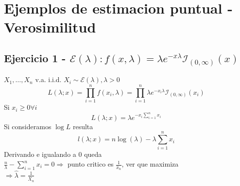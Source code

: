 \documentclass[a4paper]{article}
\begin{document}
\section{Ejemplos de estimacion puntual - Verosimilitud}
\subsection{Ejercicio 1 - $\mathcal{E}(\lambda):f(x,\lambda) = \lambda e^{-x\lambda}\mathcal{I}_{(0, \infty)}(x)$}
$X_{1},\dots,X_{n}$ v.a. i.i.d. $X_{i} \sim \mathcal{E}(\lambda), \lambda > 0$
\begin{equation*}
    L(\lambda; x) = \prod_{i=1}^n f(x_{i}, \lambda) = \prod_{i=1}^n \lambda e^{-x_{i}\lambda}\mathcal{I}_{(0,\infty)}(x_{i})
\end{equation*}
Si $x_{i}\geq 0 \forall i$
\begin{equation*}
    L(\lambda; x) = \lambda e^{-x_{i}\sum_{i=1}^n x_{i}}
\end{equation*}
Si consideramos $\log L$ resulta
\begin{equation*}
    l(\lambda;x) = n \log(\lambda)-\lambda \sum_{i=1}^n x_{i}
\end{equation*}
Derivando e igualando a 0 queda \\
$\frac{n}{\lambda} - \sum_{i=1}^n x_{i} = 0 \Rightarrow$ punto critico es $\frac{1}{\bar{x}_{n}}$, ver que maximiza \\
$\Rightarrow \widehat{\lambda} = \frac{1}{\bar{X}_{n}}$
\end{document}
